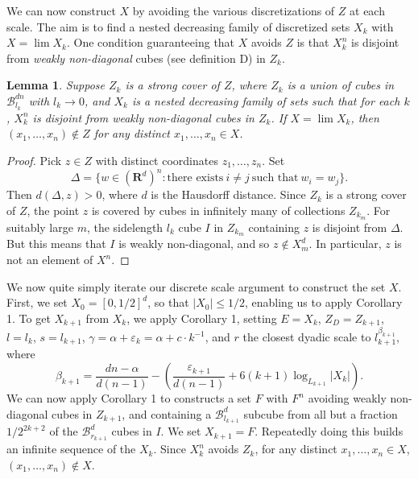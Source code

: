 \documentclass[dvipsnames]{article}
\theoremstyle{plain}
\newtheorem{lemma}{Lemma}
\theoremstyle{plain}
\begin{document}
We can now construct $X$ by avoiding the various discretizations of $Z$ at each scale. The aim is to find a nested decreasing family of discretized sets $X_k$ with $X = \lim X_k$. One condition guaranteeing that $X$ avoids $Z$ is that $X_k^n$ is disjoint from {\it weakly non-diagonal} cubes (see definition D) in $Z_k$.

\begin{lemma}
	Suppose $Z_k$ is a strong cover of $Z$, where $Z_k$ is a union of cubes in $\mathcal{B}^{dn}_{l_k}$ with $l_k \to 0$, and $X_k$ is a nested decreasing family of sets such that for each $k$, $X_k^n$ is disjoint from weakly non-diagonal cubes in $Z_k$. If $X = \lim X_k$, then $(x_1, \dots, x_n) \not \in Z$ for any distinct $x_1, \dots, x_n \in X$.
\end{lemma}
\begin{proof}
	Pick $z \in Z$ with distinct coordinates $z_1, \dots, z_n$. Set
	\[ \Delta = \{ w \in (\mathbf{R}^d)^n : \text{there exists}\ i \neq j\ \text{such that}\ w_i = w_j \}. \]
	Then $d(\Delta,z) > 0$, where $d$ is the Hausdorff distance. Since $Z_k$ is a strong cover of $Z$, the point $z$ is covered by cubes in infinitely many of collections $Z_{k_m}$. For suitably large $m$, the sidelength $l_k$ cube $I$ in $Z_{k_m}$ containing $z$ is disjoint from $\Delta$. But this means that $I$ is weakly non-diagonal, and so $z \not \in X_m^d$. In particular, $z$ is not an element of $X^n$.
\end{proof}

We now quite simply iterate our discrete scale argument to construct the set $X$. First, we set $X_0 = [0,1/2]^d$, so that $|X_0| \leq 1/2$, enabling us to apply Corollary 1. To get $X_{k+1}$ from $X_k$, we apply Corollary 1, setting $E = X_k$, $Z_D = Z_{k+1}$, $l = l_k$, $s = l_{k+1}$, $\gamma = \alpha + \varepsilon_k = \alpha + c \cdot k^{-1}$, and $r$ the closest dyadic scale to $l_{k+1}^{\beta_{k+1}}$, where
%
\begin{equation} \label{betadef}
	\beta_{k+1} = \frac{dn - \alpha}{d(n-1)} - \left( \frac{\varepsilon_{k+1}}{d(n-1)} + 6(k+1) \log_{L_{k+1}} |X_k| \right).
\end{equation}
%
We can now apply Corollary 1 to constructs a set $F$ with $F^n$ avoiding weakly non-diagonal cubes in $Z_{k+1}$, and containing a $\mathcal{B}^d_{l_{k+1}}$ subcube from all but a fraction $1/2^{2k +2}$ of the $\mathcal{B}^d_{r_{k+1}}$ cubes in $I$. We set $X_{k+1} = F$. Repeatedly doing this builds an infinite sequence of the $X_k$. Since $X_k^n$ avoids $Z_k$, for any distinct $x_1, \dots, x_n \in X$, $(x_1, \dots, x_n) \not \in X$.
\end{document}

